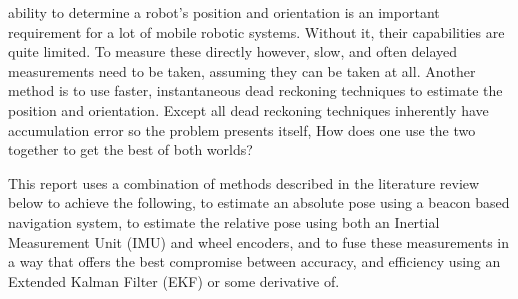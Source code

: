  ability to determine a robot's position and orientation is an important requirement for a lot of mobile robotic systems. Without it, their capabilities are quite limited. To measure these directly however, slow, and often delayed measurements need to be taken, assuming they can be taken at all. Another method is to use faster, instantaneous dead reckoning techniques to estimate the position and orientation. Except all dead reckoning techniques inherently have accumulation error so the problem presents itself, How does one use the two together to get the best of both worlds?\par
This report uses a combination of methods described in the literature review below to achieve the following, to estimate an absolute pose using a beacon based navigation system, to estimate the relative pose using both an Inertial Measurement Unit (IMU) and wheel encoders, and to fuse these measurements in a way that offers the best compromise between accuracy, and efficiency using an Extended Kalman Filter (EKF) or some derivative of.